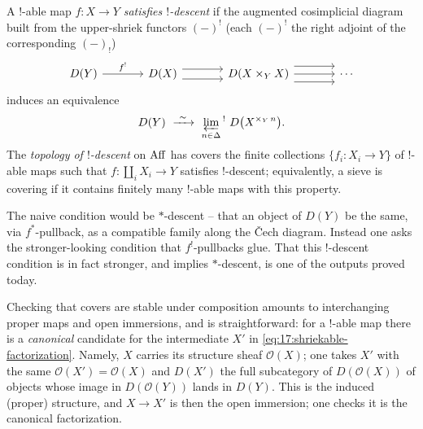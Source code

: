 \begin{definition}
\label{def:17:descent}
A $!$-able map $f\colon X\to Y$ \emph{satisfies $!$-descent} if the augmented cosimplicial
diagram built from the upper-shriek functors $(-)^{!}$ (each $(-)^{!}$ the right adjoint of
the corresponding $(-)_{!}$)
\begin{equation*}
\begin{tikzcd}[column sep=large]
D(Y) \arrow[r, "f^{!}"] & D(X) \arrow[r, shift left=1ex, "{}"] \arrow[r, shift right=1ex, "{}"'] & D(X\times_{Y}X) \arrow[r, shift left=1.6ex] \arrow[r] \arrow[r, shift right=1.6ex] & \cdots
\end{tikzcd}
\end{equation*}
induces an equivalence
\begin{equation}
\label{eq:17:shriek-limit}
D(Y)\ \xrightarrow{\ \sim\ }\ \varprojlim_{n\in\Delta}{}^{!}\ D\bigl(X^{\times_{Y}\,n}\bigr).
\end{equation}
The \emph{topology of $!$-descent} on $\operatorname{Aff}$ has covers the finite collections
$\{f_{i}\colon X_{i}\to Y\}$ of $!$-able maps such that $f\colon\coprod_{i}X_{i}\to Y$
satisfies $!$-descent; equivalently, a sieve is covering if it contains finitely many
$!$-able maps with this property.
\end{definition}

\begin{remark}
\label{rmk:17:not-star}
The naive condition would be $*$-descent -- that an object of $D(Y)$ be the same, via
$f^{*}$-pullback, as a compatible family along the \v{C}ech diagram. Instead one asks the
stronger-looking condition that $f^{!}$-pullbacks glue. That this $!$-descent condition
is in fact stronger, and implies $*$-descent, is one of the outputs proved today.
\end{remark}

\begin{remark}
\label{rmk:17:topology-composites}
Checking that covers are stable under composition amounts to interchanging proper maps
and open immersions, and is straightforward: for a $!$-able map there is a
\emph{canonical} candidate for the intermediate $X'$ in \eqref{eq:17:shriekable-factorization}.
Namely, $X$ carries its structure sheaf $\mathcal O(X)$; one takes $X'$ with the same
$\mathcal O(X') = \mathcal O(X)$ and $D(X')$ the full subcategory of $D(\mathcal O(X))$ of
objects whose image in $D(\mathcal O(Y))$ lands in $D(Y)$. This is the induced (proper)
structure, and $X\to X'$ is then the open immersion; one checks it is the canonical
factorization.
\end{remark}


